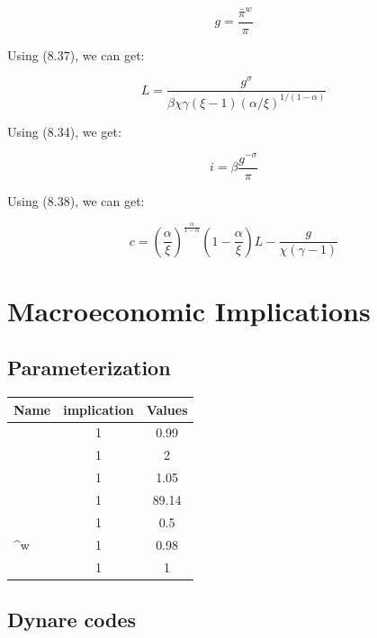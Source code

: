 \documentclass[cn,10pt,math=newtx,citestyle=gb7714-2015,bibstyle=gb7714-2015]{elegantbook}
\begin{document}
{{ \begin{equation}
 	g = \frac{\bar{\pi}^w}{\pi}
  \end{equation}

Using (8.37), we can get:

\begin{equation}
	L=\frac{g^\sigma}{ \beta \chi \gamma (\xi-1)(\alpha / \xi)^{1 /(1-\alpha)}}
\end{equation}

Using (8.34), we get:

\begin{equation}
	i = \beta \frac{g^{-\sigma}}{\pi}
\end{equation}

	Using (8.38), we can get:
	
	\begin{equation}
			c =  \left(\frac{\alpha}{\xi}\right)^{\frac{\alpha}{1-\alpha}}\left(1-\frac{\alpha}{\xi}\right)L-\frac{g}{\chi(\gamma-1)}
	\end{equation}
	
	\section{Macroeconomic Implications}
	
	\subsection{Parameterization}
	
	\begin{tabular}{|l|c|c|}
	\hline
	Name & implication & Values \\
	\hline
	\beta & 1 & 0.99 \\
	\hline
	\sigma& 1 & 2 \\
	\hline
	\gamma & 1 & 1.05 \\
	\hline
	\chi & 1 & 89.14 \\
	\hline
	\alpha & 1 & 0.5 \\
	\hline
	\pi^w & 1 & 0.98 \\
	\hline
	\phi & 1 & 1 \\
	\hline
\end{tabular}

	\subsection{Dynare codes}
	
}}
\end{document}
